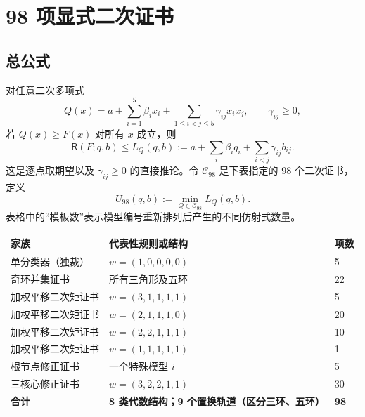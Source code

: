 \documentclass[11pt,a4paper]{ctexart}
\theoremstyle{definition}
\newcommand{\Risk}{\mathsf R}
\newcommand{\calC}{\mathcal C}
\begin{document}
\section{98 项显式二次证书}
\subsection{总公式}
对任意二次多项式
\begin{equation}\label{eq:quadratic}
Q(x)=a+\sum_{i=1}^{5}\beta_ix_i+\sum_{1\le i<j\le5}\gamma_{ij}x_ix_j,\qquad \gamma_{ij}\ge0,
\end{equation}
若 $Q(x)\ge F(x)$ 对所有 $x$ 成立，则
\begin{equation}\label{eq:upper}
\Risk(F;q,b)\le L_Q(q,b):=a+\sum_i\beta_iq_i+\sum_{i<j}\gamma_{ij}b_{ij}.
\end{equation}
这是逐点取期望以及 $\gamma_{ij}\ge0$ 的直接推论。令 $\calC_{98}$ 是下表指定的 98 个二次证书，定义
\begin{equation}\label{eq:U}
\boxed{U_{98}(q,b):=\min_{Q\in\calC_{98}}L_Q(q,b).}
\end{equation}
表格中的“模板数”表示模型编号重新排列后产生的不同仿射式数量。
\begin{center}
\begin{tabularx}{\textwidth}{@{}p{}Xp{18mm}@{}}
\toprule
家族 & 代表性规则或结构 & 项数\\\midrule
单分类器（独裁） & $w=(1,0,0,0,0)$ & 5\\
奇环并集证书 & 所有三角形及五环 & 22\\
加权平移二次矩证书 & $w=(3,1,1,1,1)$ & 5\\
加权平移二次矩证书 & $w=(2,1,1,1,0)$ & 20\\
加权平移二次矩证书 & $w=(2,2,1,1,1)$ & 10\\
加权平移二次矩证书 & $w=(1,1,1,1,1)$ & 1\\
根节点修正证书 & 一个特殊模型 $i$ & 5\\
三核心修正证书 & $w=(3,2,2,1,1)$ & 30\\\midrule
\textbf{合计} & \textbf{8 类代数结构；9 个置换轨道（区分三环、五环）} & \textbf{98}\\\bottomrule
\end{tabularx}
\end{center}
\end{document}

